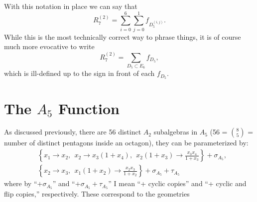 \documentclass[11pt]{article}
\def\pdfeq#1{\texorpdfstring{$#1$}{a}}
\def\fd5{f_{D_5}}
\def\drawOctagon{
\coordinate (P1) at (45:1);
\coordinate (P2) at (90:1);
\coordinate (P3) at (135:1);
\coordinate (P4) at (180:1);
\coordinate (P5) at (225:1);
\coordinate (P6) at (270:1);
\coordinate (P7) at (315:1);
\coordinate (P8) at (359:1);
\draw (P1) -- (P2) -- (P3) -- (P4) -- (P5) -- (P6) -- (P7) -- (P8) -- cycle;
}
\begin{document}
With this notation in place we can say that 
\begin{equation}
	R^{(2)}_7 = \sum_{i=0}^{6}\sum_{j=0}^{1} f_{D_5^{(i,j)}}.
\end{equation}
While this is the most technically correct way to phrase things, it is of course much more evocative to write
\begin{equation}
	R^{(2)}_7 = \sum_{D_5\subset E_6} f_{D_5},
\end{equation}
which is ill-defined up to the sign in front of each $\fd5$. 




\section{The \pdfeq{A_5} Function}\label{sec:a5-func}

As discussed previously, there are 56 distinct $A_2$ subalgebras in $A_5$ (56 = $\genfrac(){0pt}{1}{8}{5}$ = number of distinct pentagons inside an octagon), they can be parameterized by:
\begin{equation}
\begin{split}
	&\left\{x_1\to x_2,~~
	x_2\to x_3\left(1+x_4\right),~~
	x_2\left(1+x_3\right)\to \frac{x_3 x_4}{1+x_3}\right\} + \sigma_{A_5},\\
	&\left\{x_2\to x_3,~~x_1 \left(1+x_2\right)\to \frac{x_2x_3}{1+x_2}\right\} + \sigma_{A_5} + \tau_{A_5} 
   \end{split}
\end{equation}
where by ``$+\sigma_{A_5}$'' and ``$+\sigma_{A_5}+\tau_{A_5}$'' I mean ``+ cyclic copies'' and ``+ cyclic and flip copies,'' respectively. These correspond to the geometries
\begin{center}
\end{center}
\end{document}
